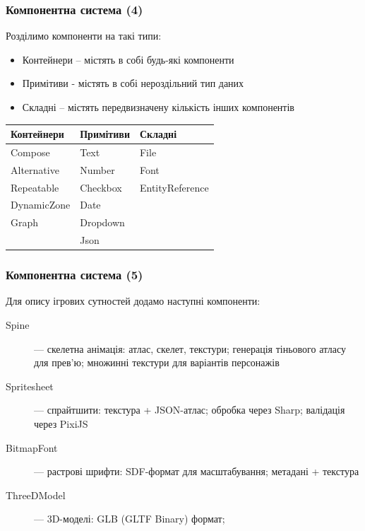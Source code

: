 \documentclass[aspectratio=169]{beamer}
\begin{document}
\begin{frame}

\frametitle{Компонентна система (4)}

  Розділимо компоненти на такі типи:

  \begin{itemize}
    \item Контейнери -- містять в собі будь-які компоненти
    \item Примітиви - містять в собі нероздільний тип даних
    \item Складні -- містять передвизначену кількість інших компонентів
  \end{itemize}

  \begin{table}
    \footnotesize
    \begin{tabular}{l|l|l}
      \textbf{Контейнери} & \textbf{Примітиви} & \textbf{Складні} \\
      \hline
      Compose     & Text           & File \\
      Alternative & Number         & Font \\
      Repeatable  & Checkbox       & EntityReference \\
      DynamicZone & Date           &  \\
      Graph       & Dropdown       &  \\
                  & Json           &
    \end{tabular}
  \end{table}
\end{frame}

\begin{frame}
\frametitle{Компонентна система (5)}

  Для опису ігрових сутностей додамо наступні компоненти:

  \begin{description}
    \item[Spine] — скелетна анімація: атлас, скелет, текстури; генерація тіньового атласу для прев'ю; множинні текстури для варіантів персонажів
    \item[Spritesheet] — спрайтшити: текстура + JSON-атлас; обробка через Sharp; валідація через PixiJS
    \item[BitmapFont] — растрові шрифти: SDF-формат для масштабування; метадані + текстура
    \item[ThreeDModel] — 3D-моделі: GLB (GLTF Binary) формат;
  \end{description}
\end{frame}
\end{document}
